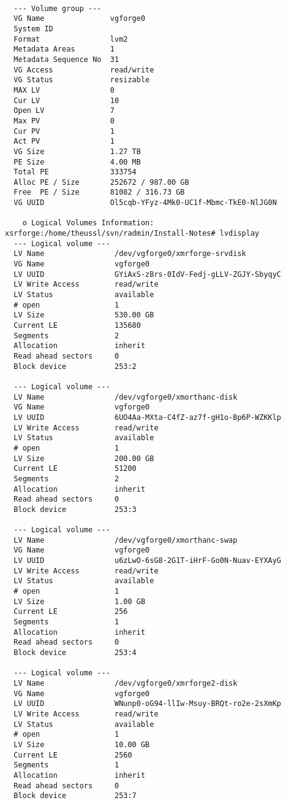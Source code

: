 \documentclass[a4paper]{article}
\begin{document}
\begin{lstlisting}

  --- Volume group ---
  VG Name               vgforge0
  System ID             
  Format                lvm2
  Metadata Areas        1
  Metadata Sequence No  31
  VG Access             read/write
  VG Status             resizable
  MAX LV                0
  Cur LV                10
  Open LV               7
  Max PV                0
  Cur PV                1
  Act PV                1
  VG Size               1.27 TB
  PE Size               4.00 MB
  Total PE              333754
  Alloc PE / Size       252672 / 987.00 GB
  Free  PE / Size       81082 / 316.73 GB
  VG UUID               Ol5cqb-YFyz-4Mk0-UC1f-Mbmc-TkE0-NlJG0N

	o Logical Volumes Information:
xsrforge:/home/theussl/svn/radmin/Install-Notes# lvdisplay
  --- Logical volume ---
  LV Name                /dev/vgforge0/xmrforge-srvdisk
  VG Name                vgforge0
  LV UUID                GYiAxS-zBrs-0IdV-Fedj-gLLV-ZGJY-SbyqyC
  LV Write Access        read/write
  LV Status              available
  # open                 1
  LV Size                530.00 GB
  Current LE             135680
  Segments               2
  Allocation             inherit
  Read ahead sectors     0
  Block device           253:2
   
  --- Logical volume ---
  LV Name                /dev/vgforge0/xmorthanc-disk
  VG Name                vgforge0
  LV UUID                6UO4Aa-MXta-C4fZ-az7f-gH1o-Bp6P-WZKKlp
  LV Write Access        read/write
  LV Status              available
  # open                 1
  LV Size                200.00 GB
  Current LE             51200
  Segments               2
  Allocation             inherit
  Read ahead sectors     0
  Block device           253:3
   
  --- Logical volume ---
  LV Name                /dev/vgforge0/xmorthanc-swap
  VG Name                vgforge0
  LV UUID                u6zLwO-6sG8-2G1T-iHrF-Go0N-Nuav-EYXAyG
  LV Write Access        read/write
  LV Status              available
  # open                 1
  LV Size                1.00 GB
  Current LE             256
  Segments               1
  Allocation             inherit
  Read ahead sectors     0
  Block device           253:4
   
  --- Logical volume ---
  LV Name                /dev/vgforge0/xmrforge2-disk
  VG Name                vgforge0
  LV UUID                WNunp0-oG94-llIw-Msuy-BRQt-ro2e-2sXmKp
  LV Write Access        read/write
  LV Status              available
  # open                 1
  LV Size                10.00 GB
  Current LE             2560
  Segments               1
  Allocation             inherit
  Read ahead sectors     0
  Block device           253:7
   

\end{lstlisting}
\end{document}
